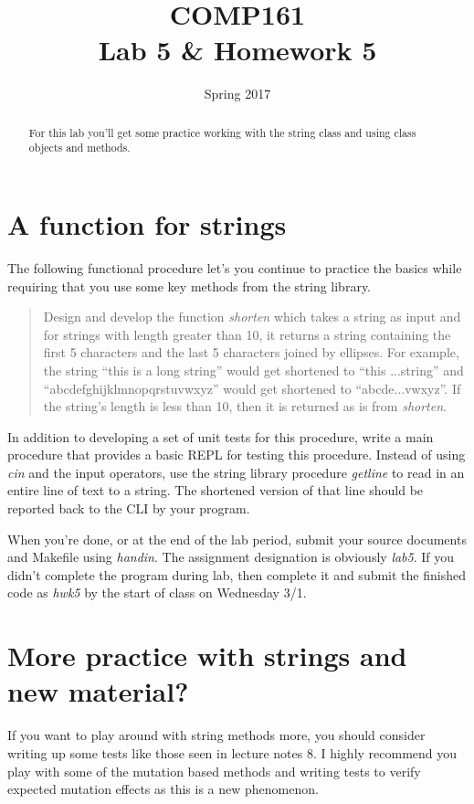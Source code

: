\documentclass[]{tufte-handout}
\title{COMP161 \\ Lab 5 \& Homework 5}
\author{}
\date{Spring 2017}
\begin{document}
\maketitle

\begin{abstract}
For this lab you'll get some practice working with the string class and using class objects and methods.
\end{abstract}

\section{ A function for strings }

The following functional procedure let's you continue to practice the basics while requiring that you use some key methods from the string library.
\begin{quote}
Design and develop the function \textit{shorten} which takes a string as input and for strings with length greater than 10, it returns a string containing the first 5 characters and the last 5 characters joined by ellipses. For example, the string ``this is a long string'' would get shortened to ``this ...string'' and ``abcdefghijklmnopqrstuvwxyz'' would get shortened to ``abcde...vwxyz''. If the string's length is less than 10, then it is returned as is from \textit{shorten}.
\end{quote}
In addition to developing a set of unit tests for this procedure, write a main procedure that provides a basic REPL for testing this procedure. Instead of using \textit{cin} and the input operators, use the string library procedure \textit{getline} to read in an entire line of text to a string. The shortened version of that line should be reported back to the CLI by your program.

When you're done, or at the end of the lab period, submit your source documents and Makefile using \textit{handin}. The assignment designation is obviously \textit{lab5}. If you didn't complete the program during lab, then complete it and submit the finished code as \textit{hwk5} by the start of class on Wednesday 3/1.

\section{ More practice with strings and new material? }

If you want to play around with string methods more, you should consider writing up some tests like those seen in lecture notes 8. I highly recommend you play with some of the mutation based methods and writing tests to verify expected mutation effects as this is a new phenomenon.
\end{document}

